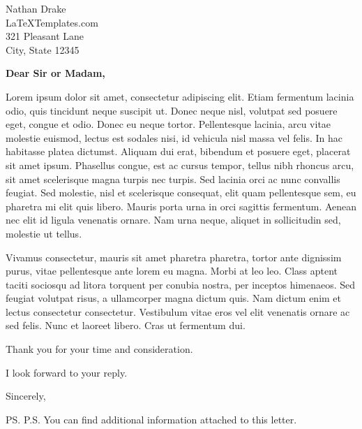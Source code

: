 \documentclass[10pt]{letter} %
\begin{document}

\begin{letter}{Nathan Drake \\ LaTeXTemplates.com \\ 321 Pleasant Lane \\ City, State 12345} %


\opening{\textbf{Dear Sir or Madam,}}

Lorem ipsum dolor sit amet, consectetur adipiscing elit. Etiam fermentum lacinia odio, quis tincidunt neque suscipit ut. Donec neque nisl, volutpat sed posuere eget, congue et odio. Donec eu neque tortor. Pellentesque lacinia, arcu vitae molestie euismod, lectus est sodales nisi, id vehicula nisl massa vel felis. In hac habitasse platea dictumst. Aliquam dui erat, bibendum et posuere eget, placerat sit amet ipsum. Phasellus congue, est ac cursus tempor, tellus nibh rhoncus arcu, sit amet scelerisque magna turpis nec turpis. Sed lacinia orci ac nunc convallis feugiat. Sed molestie, nisl et scelerisque consequat, elit quam pellentesque sem, eu pharetra mi elit quis libero. Mauris porta urna in orci sagittis fermentum. Aenean nec elit id ligula venenatis ornare. Nam urna neque, aliquet in sollicitudin sed, molestie ut tellus.

Vivamus consectetur, mauris sit amet pharetra pharetra, tortor ante dignissim purus, vitae pellentesque ante lorem eu magna. Morbi at leo leo. Class aptent taciti sociosqu ad litora torquent per conubia nostra, per inceptos himenaeos. Sed feugiat volutpat risus, a ullamcorper magna dictum quis. Nam dictum enim et lectus consectetur consectetur. Vestibulum vitae eros vel elit venenatis ornare ac sed felis. Nunc et laoreet libero. Cras ut fermentum dui.

Thank you for your time and consideration.

I look forward to your reply.

\vspace{2\parskip} %
\closing{Sincerely,}
\vspace{2\parskip} %

\ps{P.S. You can find additional information attached to this letter.} %



\end{letter}
 
\end{document}
